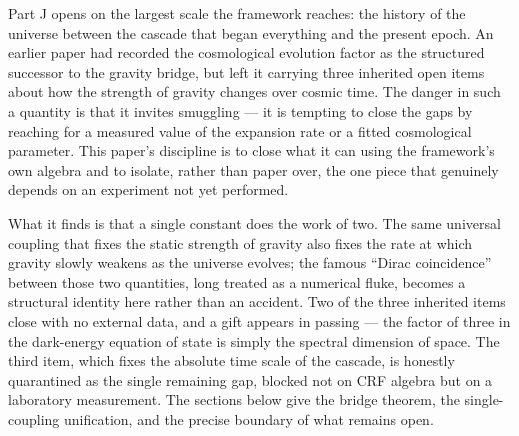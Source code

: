 \documentclass[12pt, a4paper]{article}
\begin{document}
\newpage

Part J opens on the largest scale the framework reaches: the history of the
universe between the cascade that began everything and the present epoch. An
earlier paper had recorded the cosmological evolution factor as the structured
successor to the gravity bridge, but left it carrying three inherited open
items about how the strength of gravity changes over cosmic time. The danger
in such a quantity is that it invites smuggling --- it is tempting to close
the gaps by reaching for a measured value of the expansion rate or a fitted
cosmological parameter. This paper's discipline is to close what it can using
the framework's own algebra and to isolate, rather than paper over, the one
piece that genuinely depends on an experiment not yet performed.

What it finds is that a single constant does the work of two. The same
universal coupling that fixes the static strength of gravity also fixes the
rate at which gravity slowly weakens as the universe evolves; the famous
``Dirac coincidence'' between those two quantities, long treated as a numerical
fluke, becomes a structural identity here rather than an accident. Two of the
three inherited items close with no external data, and a gift appears in
passing --- the factor of three in the dark-energy equation of state is simply
the spectral dimension of space. The third item, which fixes the absolute time
scale of the cascade, is honestly quarantined as the single remaining gap,
blocked not on CRF algebra but on a laboratory measurement. The sections below
give the bridge theorem, the single-coupling unification, and the precise
boundary of what remains open.

\sloppy
\end{document}
